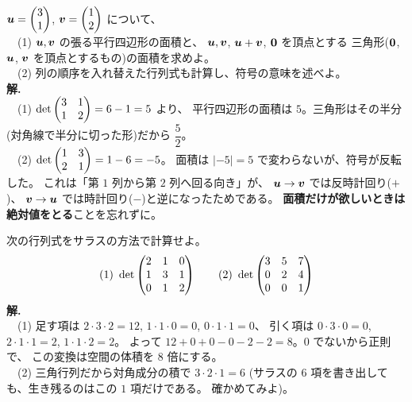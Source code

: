 \begin{rei}[例題・基本(面積と向き)]\label{rei:det-area-ex}
$\bm{u} = \begin{pmatrix}3 \\ 1\end{pmatrix}$, $\bm{v} = \begin{pmatrix}1 \\ 2\end{pmatrix}$ について、\\
　(1) $\bm{u}, \bm{v}$ の張る平行四辺形の面積と、
$\bm{u}, \bm{v}$, $\bm{u} + \bm{v}$, $\bm{0}$ を頂点とする
三角形($\bm{0}$, $\bm{u}$, $\bm{v}$ を頂点とするもの)の面積を求めよ。\\
　(2) 列の順序を入れ替えた行列式も計算し、符号の意味を述べよ。\\
\textbf{解.}\\
　(1) $\det \begin{pmatrix}3 & 1 \\ 1 & 2\end{pmatrix} = 6 - 1 = 5$ より、
平行四辺形の面積は $5$。三角形はその半分(対角線で半分に切った形)だから
$\dfrac{5}{2}$。\\
　(2) $\det \begin{pmatrix}1 & 3 \\ 2 & 1\end{pmatrix} = 1 - 6 = -5$。
面積は $|-5| = 5$ で変わらないが、符号が反転した。
これは「第 $1$ 列から第 $2$ 列へ回る向き」が、
$\bm{u} \to \bm{v}$ では反時計回り($+$)、
$\bm{v} \to \bm{u}$ では時計回り($-$)と逆になったためである。
\textbf{面積だけが欲しいときは絶対値をとる}ことを忘れずに。
\end{rei}

\begin{rei}[例題・基本($3$ 次の計算)]\label{rei:det-sarrus}
次の行列式をサラスの方法で計算せよ。
\[
(1)\ \det \mat{2 & 1 & 0 \\ 1 & 3 & 1 \\ 0 & 1 & 2} \qquad
(2)\ \det \mat{3 & 5 & 7 \\ 0 & 2 & 4 \\ 0 & 0 & 1}
\]
\textbf{解.}\\
　(1) 足す項は
$2 \cdot 3 \cdot 2 = 12$, $1 \cdot 1 \cdot 0 = 0$, $0 \cdot 1 \cdot 1 = 0$、
引く項は
$0 \cdot 3 \cdot 0 = 0$, $2 \cdot 1 \cdot 1 = 2$, $1 \cdot 1 \cdot 2 = 2$。
よって $12 + 0 + 0 - 0 - 2 - 2 = 8$。$0$ でないから正則で、
この変換は空間の体積を $8$ 倍にする。\\
　(2) 三角行列だから対角成分の積で $3 \cdot 2 \cdot 1 = 6$
(サラスの $6$ 項を書き出しても、生き残るのはこの $1$ 項だけである。
確かめてみよ)。
\end{rei}

